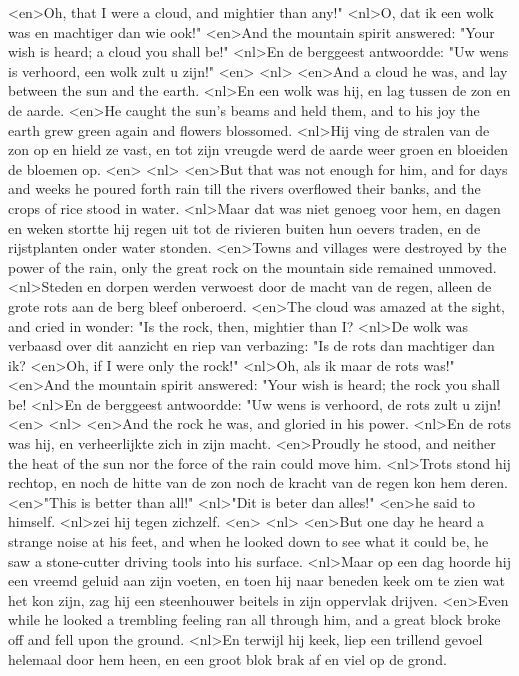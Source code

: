 <en>Oh, that I were a cloud, and mightier than any!"
<nl>O, dat ik een wolk was en machtiger dan wie ook!"
<en>And the mountain spirit answered: "Your wish is heard; a cloud you shall be!"
<nl>En de berggeest antwoordde: "Uw wens is verhoord, een wolk zult u zijn!"
<en>
<nl>
<en>And a cloud he was, and lay between the sun and the earth.
<nl>En een wolk was hij, en lag tussen de zon en de aarde.
<en>He caught the sun's beams and held them, and to his joy the earth grew green again and flowers blossomed.
<nl>Hij ving de stralen van de zon op en hield ze vast, en tot zijn vreugde werd de aarde weer groen en bloeiden de bloemen op.
<en>
<nl>
<en>But that was not enough for him, and for days and weeks he poured forth rain till the rivers overflowed their banks, and the crops of rice stood in water.
<nl>Maar dat was niet genoeg voor hem, en dagen en weken stortte hij regen uit tot de rivieren buiten hun oevers traden, en de rijstplanten onder water stonden.
<en>Towns and villages were destroyed by the power of the rain, only the great rock on the mountain side remained unmoved.
<nl>Steden en dorpen werden verwoest door de macht van de regen, alleen de grote rots aan de berg bleef onberoerd.
<en>The cloud was amazed at the sight, and cried in wonder: "Is the rock, then, mightier than I?
<nl>De wolk was verbaasd over dit aanzicht en riep van verbazing: "Is de rots dan machtiger dan ik?
<en>Oh, if I were only the rock!"
<nl>Oh, als ik maar de rots was!"
<en>And the mountain spirit answered: "Your wish is heard; the rock you shall be!
<nl>En de berggeest antwoordde: "Uw wens is verhoord, de rots zult u zijn!
<en>
<nl>
<en>And the rock he was, and gloried in his power.
<nl>En de rots was hij, en verheerlijkte zich in zijn macht.
<en>Proudly he stood, and neither the heat of the sun nor the force of the rain could move him.
<nl>Trots stond hij rechtop, en  noch de hitte van de zon noch de kracht van de regen kon hem deren.
<en>"This is better than all!"
<nl>"Dit is beter dan alles!"
<en>he said to himself.
<nl>zei hij tegen zichzelf.
<en>
<nl>
<en>But one day he heard a strange noise at his feet, and when he looked down to see what it could be, he saw a stone-cutter driving tools into his surface.
<nl>Maar op een dag hoorde hij een vreemd geluid aan zijn voeten, en toen hij naar beneden keek om te zien wat het kon zijn, zag hij een steenhouwer beitels in zijn oppervlak drijven.
<en>Even while he looked a trembling feeling ran all through him, and a great block broke off and fell upon the ground.
<nl>En terwijl hij keek, liep een trillend gevoel helemaal door hem heen, en een groot blok brak af en viel op de grond.
